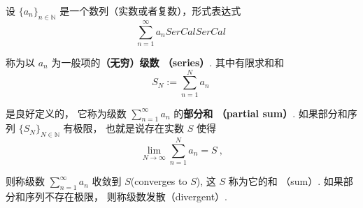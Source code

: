


设 $\{a_n\}_{n\in\mathbb{N}}$ 是一个数列（实数或者复数），形式表达式
\begin{equation}
\sum_{n=1}^\infty a_nSerCalSerCal~
\end{equation}



称为以 $a_n$ 为一般项的\textbf{（无穷）级数 （series）}. 其中有限求和和
\begin{equation}
S_N:=\sum_{n=1}^N a_n~
\end{equation}



是良好定义的， 它称为级数 $\sum_{n=1}^\infty a_n$ 的\textbf{部分和 （partial sum）}. 如果部分和序列 $\{S_N\}_{N\in\mathbb{N}}$ 有极限， 也就是说存在实数 $S$ 使得
\begin{equation}
\lim_{N\to\infty}\sum_{n=1}^N a_n=S~,
\end{equation}


则称级数 $\sum_{n=1}^\infty a_n$ 收敛到 $S$(converges to $S$), 这 $S$ 称为它的和 （sum）. 如果部分和序列不存在极限， 则称级数发散（divergent）. 

